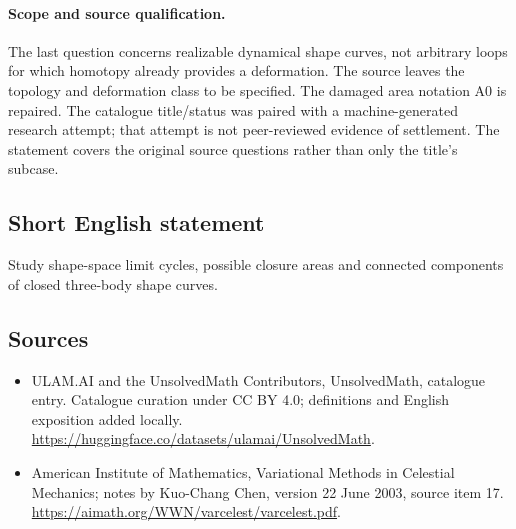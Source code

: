 \documentclass[11pt]{article}
\begin{document}
\paragraph{Scope and source qualification.}The last question concerns realizable dynamical shape curves, not arbitrary loops for which homotopy already provides a deformation. The source leaves the topology and deformation class to be specified. The damaged area notation A0 is repaired. The catalogue title/status was paired with a machine-generated research attempt; that attempt is not peer-reviewed evidence of settlement. The statement covers the original source questions rather than only the title’s subcase.
\subsection{Short English statement}
Study shape-space limit cycles, possible closure areas and connected components of closed three-body shape curves.
\subsection{Sources}
\begin{itemize}
\item[\hypertarget{source:statement:1}{S1}] ULAM.AI and the UnsolvedMath Contributors, UnsolvedMath, catalogue entry. Catalogue curation under CC BY 4.0; definitions and English exposition added locally.
\url{https://huggingface.co/datasets/ulamai/UnsolvedMath}.
\item[\hypertarget{source:statement:2}{S2}] American Institute of Mathematics, Variational Methods in Celestial Mechanics; notes by Kuo-Chang Chen, version 22 June 2003, source item 17.
\url{https://aimath.org/WWN/varcelest/varcelest.pdf}.
\end{itemize}
\label{end:statement}
\end{document}

